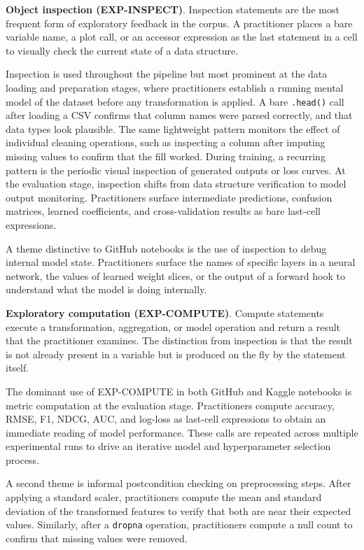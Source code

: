 \documentclass[a4paper,USenglish,cleveref,autoref,thm-restate,anonymous]{lipics-v2021}       %
\begin{document}
\textbf{Object inspection (EXP-INSPECT)}.
Inspection statements are the most frequent form of exploratory feedback in the corpus.
A practitioner places a bare variable name,
a plot call,
or an accessor expression
as the last statement in a cell
to visually check the current state of a data structure.

Inspection is used throughout the pipeline
but most prominent at the data loading and preparation stages,
where practitioners establish a running mental model of the dataset
before any transformation is applied.
A bare \lstinline{.head()} call after loading a CSV
confirms that column names were parsed correctly,
and that data types look plausible.
The same lightweight pattern monitors the effect of individual cleaning operations,
such as inspecting a column after imputing missing values to confirm that the fill worked.
During training,
a recurring pattern is the periodic visual inspection of generated outputs
or loss curves.
At the evaluation stage,
inspection shifts from data structure verification to model output monitoring.
Practitioners surface intermediate predictions,
confusion matrices,
learned coefficients,
and cross-validation results as bare last-cell expressions.

A theme distinctive to GitHub notebooks
is the use of inspection to debug internal model state.
Practitioners surface the names of specific layers in a neural network,
the values of learned weight slices,
or the output of a forward hook
to understand what the model is doing internally.

\textbf{Exploratory computation (EXP-COMPUTE)}.
Compute statements execute a transformation, aggregation, or model operation
and return a result that the practitioner examines.
The distinction from inspection is that the result is not already present in a variable
but is produced on the fly by the statement itself.

The dominant use of EXP-COMPUTE in both GitHub and Kaggle notebooks
is metric computation at the evaluation stage.
Practitioners compute accuracy, RMSE, F1, NDCG, AUC, and log-loss
as last-cell expressions
to obtain an immediate reading of model performance.
These calls are repeated across multiple experimental runs
to drive an iterative model and hyperparameter selection process.

A second theme is informal postcondition checking on preprocessing steps.
After applying a standard scaler,
practitioners compute the mean and standard deviation of the transformed features
to verify that both are near their expected values.
Similarly, after a \lstinline{dropna} operation,
practitioners compute a null count to confirm that missing values were removed.
\end{document}
